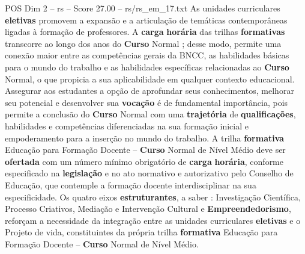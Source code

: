\begin{textsample}{POS Dim 2 – rs – Score 27.00 – rs/rs\_em\_17.txt}
As unidades curriculares \textbf{eletivas} promovem a expansão e a articulação de temáticas contemporâneas ligadas à formação de professores.
A \textbf{carga} \textbf{horária} das trilhas \textbf{formativas} transcorre ao longo dos anos do \textbf{Curso} Normal ; desse modo, permite uma conexão maior entre as competências gerais da BNCC, as habilidades básicas para o mundo do trabalho e as habilidades específicas relacionadas ao \textbf{Curso} Normal, o que propicia a sua aplicabilidade em qualquer contexto educacional.
Assegurar aos estudantes a opção de aprofundar seus conhecimentos, melhorar seu potencial e desenvolver sua \textbf{vocação} é de fundamental importância, pois permite a conclusão do \textbf{Curso} Normal com uma \textbf{trajetória} de \textbf{qualificações}, habilidades e competências diferenciadas na sua formação inicial e empoderamento para a inserção no mundo do trabalho.
A trilha \textbf{formativa} Educação para Formação Docente – \textbf{Curso} Normal de Nível Médio deve ser \textbf{ofertada} com um número mínimo obrigatório de \textbf{carga} \textbf{horária}, conforme especificado na \textbf{legislação} e no ato normativo e autorizativo pelo Conselho de Educação, que contemple a formação docente interdisciplinar na sua especificidade.
Os quatro eixos \textbf{estruturantes}, a saber : Investigação Científica, Processo Criativos, Mediação e Intervenção Cultural e \textbf{Empreendedorismo}, reforçam a necessidade da integração entre as unidades curriculares \textbf{eletivas} e o Projeto de vida, constituintes da própria trilha \textbf{formativa} Educação para Formação Docente – \textbf{Curso} Normal de Nível Médio.

\end{textsample}
